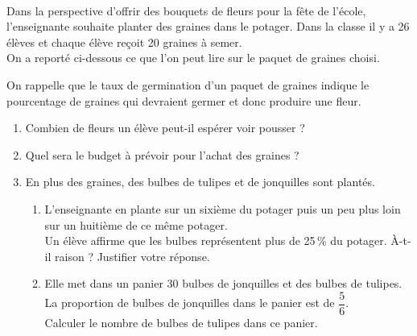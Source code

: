 \begin{activite}
   \ \\ [-16mm]
   \begin{QCM}
      Dans la perspective d’offrir des bouquets de fleurs pour la fête de l’école, l’enseignante souhaite planter des graines dans le potager. Dans la classe il y a 26 élèves et chaque élève reçoit 20 graines à semer. \\
On a reporté ci-dessous ce que l’on peut  lire sur le paquet de graines choisi.
      \begin{center}
      \end{center}
      On rappelle que le taux de germination d’un paquet de graines indique le pourcentage de graines qui devraient germer et donc produire une fleur.
      \begin{enumerate}
         \item Combien de fleurs un élève peut-il espérer voir pousser ? 
         \item Quel sera le budget à prévoir pour l’achat des graines ?
         \item En plus des graines, des bulbes de tulipes et de jonquilles sont plantés.
            \begin{enumerate}
               \item L’enseignante en plante sur un sixième du potager puis un peu plus loin sur un huitième de ce même potager. \\
                  Un élève affirme que les bulbes représentent plus de 25\,\% du potager. À-t-il raison ? Justifier votre réponse.
              \item Elle met dans un panier 30 bulbes de jonquilles et des bulbes de tulipes. La proportion de bulbes de jonquilles dans le panier est de $\dfrac56$. \\ [1mm]
                 Calculer le nombre de bulbes de tulipes dans ce panier. \medskip
           \end{enumerate}
     \end{enumerate}
   \end{QCM}
   

\end{activite}
